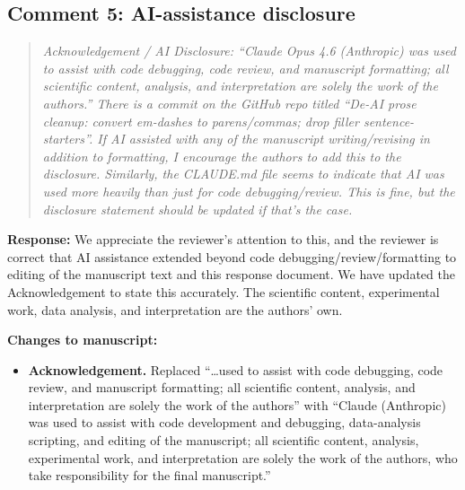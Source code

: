 \documentclass[11pt]{article}
\newenvironment{reviewer}{%
  \begin{quote}\itshape\color{black!70}}{%
  \end{quote}}
\newcommand{\response}[1]{\noindent\textbf{Response:} #1\par\medskip}
\newenvironment{changes}{%
  \noindent\textbf{Changes to manuscript:}
  \begin{itemize}[leftmargin=2em,itemsep=2pt]}{%
  \end{itemize}\medskip}
\begin{document}
\subsection*{Comment 5: AI-assistance disclosure}
\begin{reviewer}
Acknowledgement / AI Disclosure: ``Claude Opus 4.6 (Anthropic) was used to assist with code debugging, code review, and manuscript formatting; all scientific content, analysis, and interpretation are solely the work of the authors.'' There is a commit on the GitHub repo titled ``De-AI prose cleanup: convert em-dashes to parens/commas; drop filler sentence-starters''. If AI assisted with any of the manuscript writing/revising in addition to formatting, I encourage the authors to add this to the disclosure. Similarly, the CLAUDE.md file seems to indicate that AI was used more heavily than just for code debugging/review. This is fine, but the disclosure statement should be updated if that's the case.
\end{reviewer}
\response{We appreciate the reviewer's attention to this, and the reviewer is correct that AI assistance extended beyond code debugging/review/formatting to editing of the manuscript text and this response document. We have updated the Acknowledgement to state this accurately. The scientific content, experimental work, data analysis, and interpretation are the authors' own.}
\begin{changes}
  \item \textbf{Acknowledgement.} Replaced ``\ldots used to assist with code debugging, code review, and manuscript formatting; all scientific content, analysis, and interpretation are solely the work of the authors'' with ``Claude (Anthropic) was used to assist with code development and debugging, data-analysis scripting, and editing of the manuscript; all scientific content, analysis, experimental work, and interpretation are solely the work of the authors, who take responsibility for the final manuscript.''
\end{changes}
\end{document}
